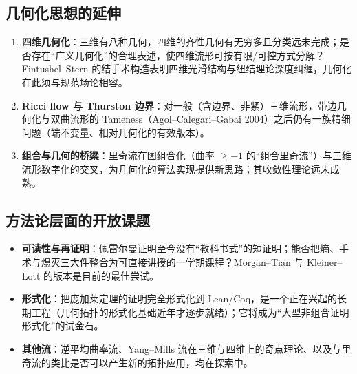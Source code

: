 \subsection{几何化思想的延伸}

\begin{enumerate}[label=(\arabic*)]
    \item \textbf{四维几何化}：三维有八种几何，四维的齐性几何有无穷多且分类远未完成；是否存在“广义几何化”的合理表述，使四维流形可按有限/可控方式分解？Fintushel--Stern 的结手术构造表明四维光滑结构与纽结理论深度纠缠，几何化在此须与规范场论相容。
    \item \textbf{Ricci flow 与 Thurston 边界}：对一般（含边界、非紧）三维流形，带边几何化与双曲流形的 Tameness（Agol--Calegari--Gabai 2004）之后仍有一族精细问题（端不变量、相对几何化的有效版本）。
    \item \textbf{组合与几何的桥梁}：里奇流在图组合化（曲率 $\geq -1$ 的“组合里奇流”）与三维流形数字化的交叉，为几何化的算法实现提供新思路；其收敛性理论远未成熟。
\end{enumerate}

\subsection{方法论层面的开放课题}

\begin{itemize}
    \item \textbf{可读性与再证明}：佩雷尔曼证明至今没有“教科书式”的短证明；能否把熵、手术与熄灭三大件整合为可直接讲授的一学期课程？Morgan--Tian 与 Kleiner--Lott 的版本是目前的最佳尝试。
    \item \textbf{形式化}：把庞加莱定理的证明完全形式化到 Lean/Coq，是一个正在兴起的长期工程（几何拓扑的形式化基础近年才逐步就绪）；它将成为“大型非组合证明形式化”的试金石。
    \item \textbf{其他流}：逆平均曲率流、Yang--Mills 流在三维与四维上的奇点理论、以及与里奇流的类比是否可以产生新的拓扑应用，均在探索中。
\end{itemize}
